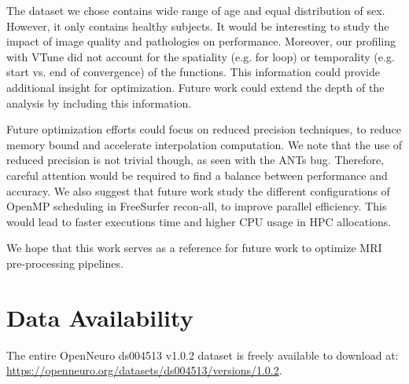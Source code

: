 \documentclass[conference]{IEEEtran}
\newcommand{\TG}[1]{\color{blue}\textsc{From Tristan: }#1\color{black}}
\newcommand{\MD}[1]{\color{magenta}\textsc{From Mathieu: }#1\color{black}}
\begin{document}
The dataset we chose contains wide range of age and equal distribution of sex. However, it only contains healthy subjects. It would be interesting to study the impact of image quality and pathologies on performance. Moreover, our profiling with VTune did not account for the spatiality (e.g. for loop) or temporality (e.g. start vs. end of convergence) of the functions. This information could provide additional insight for optimization. Future work could extend the depth of the analysis by including this information.

Future optimization efforts could focus on reduced precision techniques, to reduce memory bound and accelerate interpolation computation. We note that the use of reduced precision is not trivial though, as seen with the ANTs bug. Therefore, careful attention would be required to find a balance between performance and accuracy. We also suggest that future work study the different configurations of OpenMP scheduling in FreeSurfer recon-all, to improve parallel efficiency. This would lead to faster executions time and higher CPU usage in HPC allocations.

We hope that this work serves as a reference for future work to optimize MRI pre-processing pipelines. 
			
\section{Data Availability}
\label{sec:data-availability}
The entire OpenNeuro ds004513 v1.0.2 dataset is freely available to download at:
\\\href{https://openneuro.org/datasets/ds004513/versions/1.0.2}{https://openneuro.org/datasets/ds004513/versions/1.0.2}.
	
\end{document}
